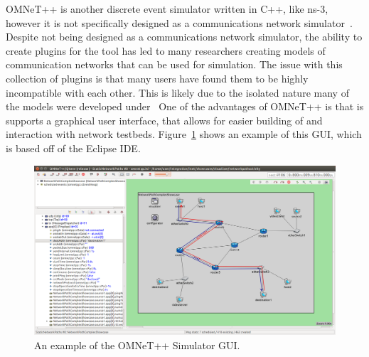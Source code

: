 OMNeT++ is another discrete event simulator written in C++, like ns-3, however it is not specifically designed as a communications network simulator~\cite{omnet++}.
Despite not being designed as a communications network simulator, the ability to create plugins for the tool has led to many researchers creating models of communication networks that can be used for simulation.
The issue with this collection of plugins is that many users have found them to be highly incompatible with each other. This is likely due to the isolated nature many of the models were developed under~\cite{tool_survey}
One of the advantages of OMNeT++ is that is supports a graphical user interface, that allows for easier building of and interaction with network testbeds.
Figure~\ref{omnet_gui} shows an example of this GUI, which is based off of the Eclipse IDE. \par

\begin{figure}[!ht]
    \centering
    \includegraphics[width=\textwidth,keepaspectratio]{Images/Chpt2/omnet_gui.png}
    \caption{An example of the OMNeT++ Simulator GUI.}
    \label{omnet_gui}
\end{figure}

